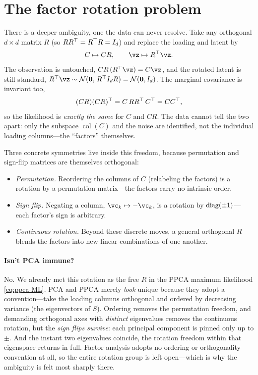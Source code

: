 \documentclass[11pt]{article}
\theoremstyle{plain}
\theoremstyle{definition}
\theoremstyle{remark}
\theoremstyle{definition}
\newcommand{\Normal}{\mathcal{N}}
\DeclareMathOperator{\col}{col}
\begin{document}
\section{The factor rotation problem}\label{sec:rotation}

There is a deeper ambiguity, one the data can never resolve. Take any orthogonal
$d \times d$ matrix $R$ (so $R R{^\top} = R{^\top} R = I_d$) and replace the loading and
latent by
\begin{equation}
    C \mapsto CR, \qquad \vz \mapsto R\trp \vz .
\end{equation}
The observation is untouched, $CR\,(R\trp\vz) = C\vz$, and the rotated latent is
still standard, $R\trp\vz \sim \Normal(\mathbf 0,\, R\trp I_d R) = \Normal(\mathbf
0, I_d)$. The marginal covariance is invariant too,
\begin{equation}\label{eq:rotation-invariance}
    (CR)(CR){^\top} = C\,R R{^\top}\,C{^\top} = C C{^\top},
\end{equation}
so the likelihood is \emph{exactly the same} for $C$ and $CR$. The data cannot
tell the two apart: only the subspace $\col(C)$ and the noise are identified, not
the individual loading columns---the ``factors'' themselves.

Three concrete symmetries live inside this freedom, because permutation and
sign-flip matrices are themselves orthogonal:
\begin{itemize}
    \item \emph{Permutation.} Reordering the columns of $C$ (relabeling the
    factors) is a rotation by a permutation matrix---the factors carry no
    intrinsic order.
    \item \emph{Sign flip.} Negating a column, $\vc_k \mapsto -\vc_k$, is a
    rotation by $\operatorname{diag}(\pm 1)$---each factor's sign is arbitrary.
    \item \emph{Continuous rotation.} Beyond these discrete moves, a general
    orthogonal $R$ blends the factors into new linear combinations of one
    another.
\end{itemize}

\paragraph{Isn't PCA immune?} No. We already met this rotation as the free $R$ in
the PPCA maximum likelihood \eqref{eq:ppca-ML}. PCA and PPCA merely \emph{look}
unique because they adopt a convention---take the loading columns orthogonal and
ordered by decreasing variance (the eigenvectors of $S$). Ordering removes the
permutation freedom, and demanding orthogonal axes with \emph{distinct}
eigenvalues removes the continuous rotation, but the \emph{sign flips survive}:
each principal component is pinned only up to $\pm$. And the instant two
eigenvalues coincide, the rotation freedom within that eigenspace returns in
full. Factor analysis adopts no ordering-or-orthogonality convention at all, so
the entire rotation group is left open---which is why the ambiguity is felt most
sharply there.
\end{document}
